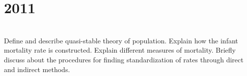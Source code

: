 \section*{2011}
\vspace{-.5cm}
\hrulefill \smallskip\\
 Define and describe quasi-stable theory of population.
\myline
{} Explain how the infant mortality rate is constructed.
\myline
{} Explain different measures of mortality. Briefly discuss about the procedures for finding standardization of rates through direct and indirect methods.


